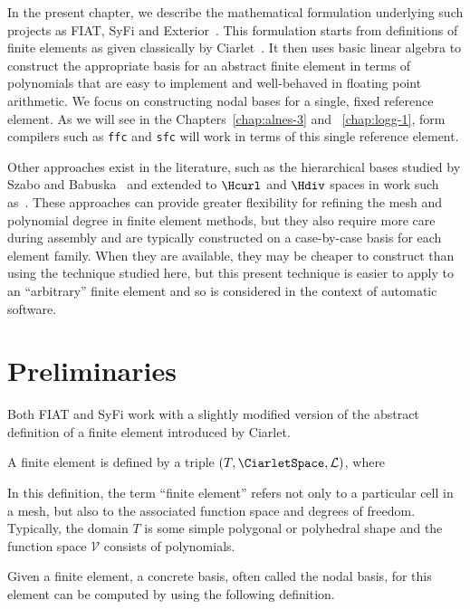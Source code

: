 In the present chapter, we describe the mathematical formulation
underlying such projects as FIAT, SyFi and Exterior~\citep{LoggMardal2009}.
This formulation starts from definitions of finite elements as
given classically by Ciarlet~\citep{Ciarlet2002}.  It then uses basic linear
algebra to construct the appropriate basis for an abstract
finite element in terms of polynomials that are easy to implement and
well-behaved in floating point arithmetic.  We focus on
constructing nodal bases for a single, fixed reference element.  As we
will see in the Chapters~\ref{chap:alnes-3} and ~\ref{chap:logg-1}, form compilers such as
\texttt{ffc} and \texttt{sfc} will work
in terms of this single reference element.


Other approaches exist in the literature, such as the hierarchical
bases studied by Szabo and Babuska~\citep{SzaboBabuska1991} and extended to \(
\Hcurl \) and \( \Hdiv \) spaces in work such
as~\citep{AinsworthCoyle2003}.  These approaches can provide greater flexibility for
refining the mesh and polynomial degree in finite element methods, but
they also require more care during assembly and are typically constructed
on a case-by-case basis for each element family.  When they are
available, they may be cheaper to construct than using the technique
studied here, but this present technique is easier to apply to an
``arbitrary'' finite element and so is considered in the context of
automatic software.


\section{Preliminaries}
Both FIAT and SyFi work with a slightly modified version of the  abstract definition of a finite element introduced by
Ciarlet.
\begin{definition}
  A finite element is defined by a triple
  $(T, \CiarletSpace,\mathcal{L})$, where
  \femdefinition{}
  \label{chap:kirby-1:fedef} 
\end{definition}
In this definition, the term ``finite element'' refers not only to
a particular cell in a  mesh, but also to the associated function
space and degrees of freedom.  Typically, the domain \( T \) is some
simple polygonal or polyhedral shape and the function space \( \mathcal{V} \)
consists of polynomials.

Given a finite element, a concrete
basis, often called the nodal basis,
for this element can be computed by using the following definition.

